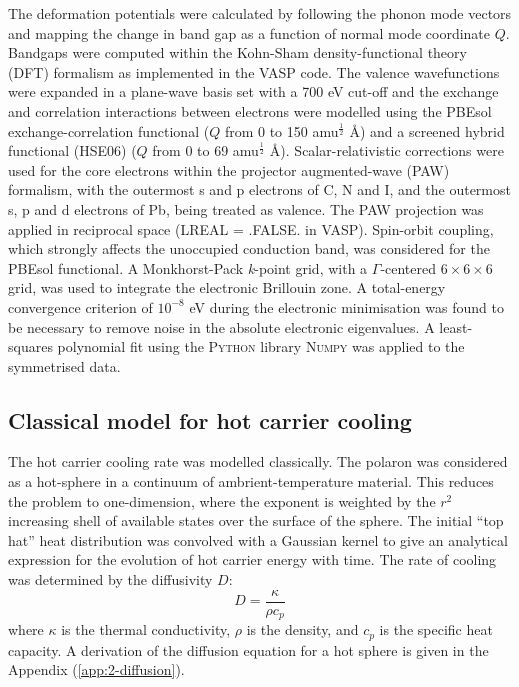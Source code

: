 The deformation potentials were calculated by following the phonon mode vectors and mapping the change in band gap as a function of normal mode coordinate $Q$.
Bandgaps were computed within the Kohn-Sham density-functional theory (DFT) formalism as implemented in the \textsc{VASP} code\cite{Kresse1996a}.
The valence wavefunctions were expanded in a plane-wave basis set with a 700 eV cut-off and the exchange and correlation interactions between electrons were modelled using the PBEsol exchange-correlation functional\cite{Perdew2008a} ($Q$ from 0 to 150 amu$^{\frac{1}{2}}$ \AA) and a screened hybrid functional (HSE06)\cite{Heyd2004a,Heyd2005a} ($Q$ from 0 to 69 amu$^{\frac{1}{2}}$ \AA).
Scalar-relativistic corrections were used for the core electrons within the projector augmented-wave (PAW) formalism,\cite{Blochl1994} with the outermost s and p electrons of C, N and I, and the outermost s, p and d electrons of Pb, being treated as valence. 
The PAW projection was applied in reciprocal space (\textsc{LREAL = .FALSE.} in \textsc{VASP}).
Spin-orbit coupling, which strongly affects the unoccupied conduction band, was considered for the PBEsol functional.
A Monkhorst-Pack \textit{k}-point grid, with a $\Gamma$-centered $6 \times 6 \times 6$ grid, was used to integrate the electronic Brillouin zone.
A total-energy convergence criterion of $10^{-8}$ eV during the electronic minimisation was found to be necessary to remove noise in the absolute electronic eigenvalues.
A least-squares polynomial fit using the \textsc{Python} library \textsc{Numpy} was applied to the symmetrised data.

\subsection{Classical model for hot carrier cooling}
The hot carrier cooling rate was modelled classically. The polaron was considered as a hot-sphere in a continuum of ambrient-temperature material. This reduces the problem to one-dimension, where the exponent is weighted by the $r^2$ increasing shell of available states over the surface of the sphere. 
The initial “top hat” heat distribution was convolved with a Gaussian kernel to give an analytical expression for the evolution of hot carrier energy with time.
The rate of cooling was determined by the diffusivity $D$:
\begin{equation}
    D = \frac{\kappa}{\rho c_p}
\end{equation}
where $\kappa$ is the thermal conductivity, $\rho$ is the density, and $c_p$ is the specific heat capacity. A derivation of the diffusion equation for a hot sphere is given in the Appendix (\ref{app:2-diffusion}).

